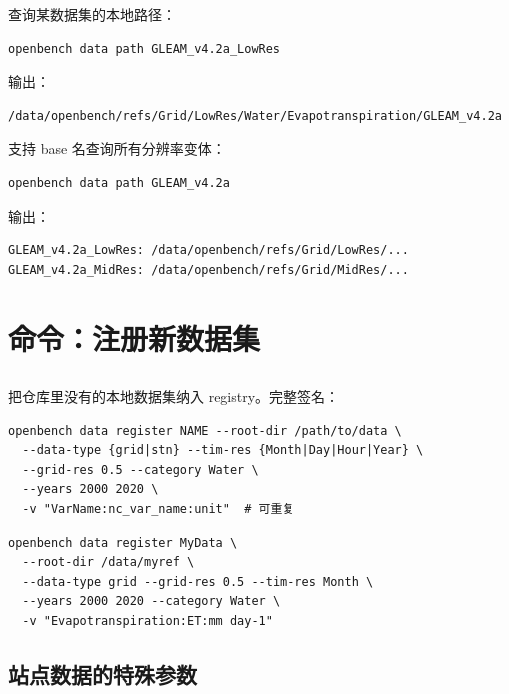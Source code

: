 查询某数据集的本地路径：

\begin{verbatim}
openbench data path GLEAM_v4.2a_LowRes
\end{verbatim}

输出：

\begin{verbatim}
/data/openbench/refs/Grid/LowRes/Water/Evapotranspiration/GLEAM_v4.2a
\end{verbatim}

支持 base 名查询所有分辨率变体：

\begin{verbatim}
openbench data path GLEAM_v4.2a
\end{verbatim}

输出：

\begin{verbatim}
GLEAM_v4.2a_LowRes: /data/openbench/refs/Grid/LowRes/...
GLEAM_v4.2a_MidRes: /data/openbench/refs/Grid/MidRes/...
\end{verbatim}

\section{命令：注册新数据集}

\subsection{}

把仓库里没有的本地数据集纳入 registry。完整签名：

\begin{verbatim}
openbench data register NAME --root-dir /path/to/data \
  --data-type {grid|stn} --tim-res {Month|Day|Hour|Year} \
  --grid-res 0.5 --category Water \
  --years 2000 2020 \
  -v "VarName:nc_var_name:unit"  # 可重复
\end{verbatim}

\begin{exampleBox}[注册一个 grid 数据集]
\begin{verbatim}
openbench data register MyData \
  --root-dir /data/myref \
  --data-type grid --grid-res 0.5 --tim-res Month \
  --years 2000 2020 --category Water \
  -v "Evapotranspiration:ET:mm day-1"
\end{verbatim}
\end{exampleBox}

\subsection{站点数据的特殊参数}

